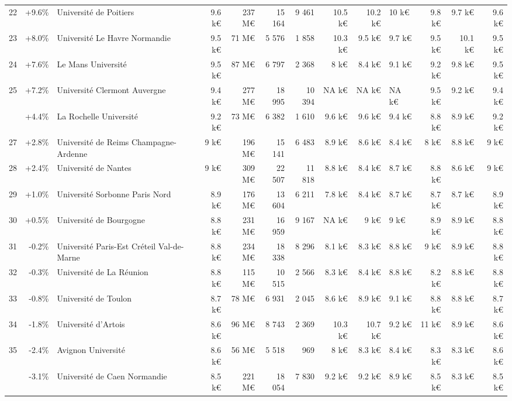 \documentclass[11pt,french,landscape]{article}
\begin{document}
\begin{longtable}{rrlrrrrrrlrrr}
22 & +9.6\% & Université de Poitiers & 9.6 k€ & 237 M€ & 15 164 & 9 461 & 10.5 k€ & 10.2 k€ & 10 k€ & 9.8 k€ & 9.7 k€ & 9.6 k€\\
\rowcolor{gray!6}  23 & +8.0\% & Université Le Havre Normandie & 9.5 k€ & 71 M€ & 5 576 & 1 858 & 10.3 k€ & 9.5 k€ & 9.7 k€ & 9.5 k€ & 10.1 k€ & 9.5 k€\\
24 & +7.6\% & Le Mans Université & 9.5 k€ & 87 M€ & 6 797 & 2 368 & 8 k€ & 8.4 k€ & 9.1 k€ & 9.2 k€ & 9.8 k€ & 9.5 k€\\
\rowcolor{gray!6}  25 & +7.2\% & Université Clermont Auvergne & 9.4 k€ & 277 M€ & 18 995 & 10 394 & NA k€ & NA k€ & NA k€ & 9.5 k€ & 9.2 k€ & 9.4 k€\\
\addlinespace
26 & +4.4\% & La Rochelle Université & 9.2 k€ & 73 M€ & 6 382 & 1 610 & 9.6 k€ & 9.6 k€ & 9.4 k€ & 8.8 k€ & 8.9 k€ & 9.2 k€\\
\rowcolor{gray!6}  27 & +2.8\% & Université de Reims Champagne-Ardenne & 9 k€ & 196 M€ & 15 141 & 6 483 & 8.9 k€ & 8.6 k€ & 8.4 k€ & 8 k€ & 8.8 k€ & 9 k€\\
28 & +2.4\% & Université de Nantes & 9 k€ & 309 M€ & 22 507 & 11 818 & 8.8 k€ & 8.4 k€ & 8.7 k€ & 8.8 k€ & 8.6 k€ & 9 k€\\
\rowcolor{gray!6}  29 & +1.0\% & Université Sorbonne Paris Nord & 8.9 k€ & 176 M€ & 13 604 & 6 211 & 7.8 k€ & 8.4 k€ & 8.7 k€ & 8.7 k€ & 8.7 k€ & 8.9 k€\\
30 & +0.5\% & Université de Bourgogne & 8.8 k€ & 231 M€ & 16 959 & 9 167 & NA k€ & 9 k€ & 9 k€ & 8.9 k€ & 8.9 k€ & 8.8 k€\\
\addlinespace
\rowcolor{gray!6}  31 & -0.2\% & Université Paris-Est Créteil Val-de-Marne & 8.8 k€ & 234 M€ & 18 338 & 8 296 & 8.1 k€ & 8.3 k€ & 8.8 k€ & 9 k€ & 8.9 k€ & 8.8 k€\\
32 & -0.3\% & Université de La Réunion & 8.8 k€ & 115 M€ & 10 515 & 2 566 & 8.3 k€ & 8.4 k€ & 8.8 k€ & 8.2 k€ & 8.8 k€ & 8.8 k€\\
\rowcolor{gray!6}  33 & -0.8\% & Université de Toulon & 8.7 k€ & 78 M€ & 6 931 & 2 045 & 8.6 k€ & 8.9 k€ & 9.1 k€ & 8.8 k€ & 8.8 k€ & 8.7 k€\\
34 & -1.8\% & Université d'Artois & 8.6 k€ & 96 M€ & 8 743 & 2 369 & 10.3 k€ & 10.7 k€ & 9.2 k€ & 11 k€ & 8.9 k€ & 8.6 k€\\
\rowcolor{gray!6}  35 & -2.4\% & Avignon Université & 8.6 k€ & 56 M€ & 5 518 & 969 & 8 k€ & 8.3 k€ & 8.4 k€ & 8.3 k€ & 8.3 k€ & 8.6 k€\\
\addlinespace
36 & -3.1\% & Université de Caen Normandie & 8.5 k€ & 221 M€ & 18 054 & 7 830 & 9.2 k€ & 9.2 k€ & 8.9 k€ & 8.5 k€ & 8.3 k€ & 8.5 k€\\

\end{longtable}
\end{document}
